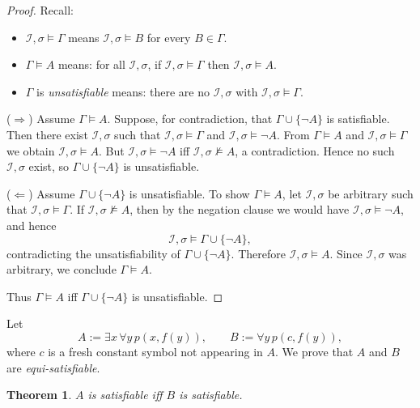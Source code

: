 \documentclass{article}
\theoremstyle{plain}
\newtheorem{theorem}{Theorem}
\theoremstyle{definition}
\theoremstyle{remark}
\begin{document}
\begin{proof}
Recall:
\begin{itemize}
  \item $\mathcal I,\sigma \vDash \Gamma$ means $\mathcal I,\sigma \vDash B$ for every $B\in\Gamma$.
  \item $\Gamma \vDash A$ means: for all $\mathcal I,\sigma$, if $\mathcal I,\sigma \vDash \Gamma$
        then $\mathcal I,\sigma \vDash A$.
  \item $\Gamma$ is \emph{unsatisfiable} means: there are no $\mathcal I,\sigma$ with
        $\mathcal I,\sigma \vDash \Gamma$.
\end{itemize}

($\Rightarrow$) Assume $\Gamma \vDash A$. Suppose, for contradiction, that
$\Gamma\cup\{\neg A\}$ is satisfiable. Then there exist $\mathcal I,\sigma$ such that
$\mathcal I,\sigma \vDash \Gamma$ and $\mathcal I,\sigma \vDash \neg A$.
From $\Gamma \vDash A$ and $\mathcal I,\sigma \vDash \Gamma$ we obtain $\mathcal I,\sigma \vDash A$.
But $\mathcal I,\sigma \vDash \neg A$ iff $\mathcal I,\sigma \not\vDash A$, a contradiction.
Hence no such $\mathcal I,\sigma$ exist, so $\Gamma\cup\{\neg A\}$ is unsatisfiable.

\medskip
($\Leftarrow$) Assume $\Gamma\cup\{\neg A\}$ is unsatisfiable. To show $\Gamma \vDash A$,
let $\mathcal I,\sigma$ be arbitrary such that $\mathcal I,\sigma \vDash \Gamma$.
If $\mathcal I,\sigma \not\vDash A$, then by the negation clause we would have
$\mathcal I,\sigma \vDash \neg A$, and hence
\[
\mathcal I,\sigma \vDash \Gamma \cup \{\neg A\},
\]
contradicting the unsatisfiability of $\Gamma\cup\{\neg A\}$. Therefore
$\mathcal I,\sigma \vDash A$. Since $\mathcal I,\sigma$ was arbitrary, we conclude
$\Gamma \vDash A$.

Thus $\Gamma \vDash A$ iff $\Gamma\cup\{\neg A\}$ is unsatisfiable.
\end{proof}

Let
\[
A := \exists x \,\forall y\, p(x,f(y)),
\qquad
B := \forall y\, p(c,f(y)),
\]
where $c$ is a fresh constant symbol not appearing in $A$.
We prove that $A$ and $B$ are \emph{equi-satisfiable}.

\begin{theorem}
$A$ is satisfiable iff $B$ is satisfiable.
\end{theorem}
\end{document}

